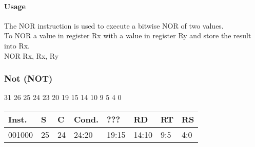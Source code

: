 \documentclass[12pt]{article}
\begin{document}
    \paragraph{Usage}
    \begin{flushleft}
    The NOR instruction is used to execute a bitwise NOR of two values.\\
    \vspace{1em}
    To NOR a value in register Rx with a value in register Ry and store the result into Rx.\\
    \vspace{1em}
    NOR Rx, Rx, Ry
    \end{flushleft}
   
   





    \newpage
    \subsubsection{Not (NOT)}
    
    \hspace{1.6cm}31 \hspace{1.2cm}26 \hspace{.075cm}25 \hspace{.15cm}24 \hspace{.075cm}23 \hspace{.875cm}20 \hspace{.04cm}19 \hspace{.8cm}15 \hspace{.04cm}14 \hspace{.8cm}10 \hspace{.04cm}9 \hspace{1.15cm}5 \hspace{.04cm}4 \hspace{1.25cm}0
    \vspace{-.25cm}
    \begin{center}
        \begin{tabular}{ |p{1.8cm}|p{.3cm}|p{.3cm}|p{1.5cm}|p{1.5cm}|p{1.5cm}|p{1.5cm}|p{1.5cm}| }
            \hline
            \textbf{Inst.} & \textbf{S}& \textbf{C} & \textbf{Cond.} & ??? & \textbf{RD} & \textbf{RT} & \textbf{RS}\\
            \hline
            001000& 25 & 24 & 24:20 & 19:15 & 14:10 & 9:5 & 4:0\\
            \hline
        \end{tabular}
    \end{center}
    
\end{document}
